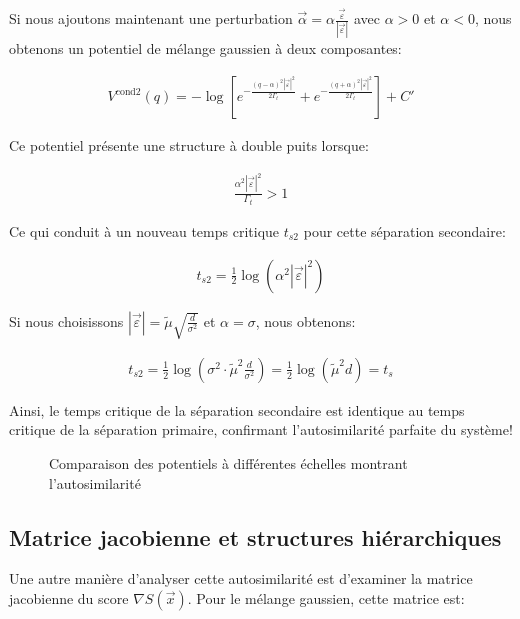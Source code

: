 \documentclass[11pt,a4paper]{article}
\begin{document}
Si nous ajoutons maintenant une perturbation $\vec{\alpha} = \alpha \frac{\vec{\varepsilon}}{|\vec{\varepsilon}|}$ avec $\alpha > 0$ et $\alpha < 0$, nous obtenons un potentiel de mélange gaussien à deux composantes:

\begin{align}
V^{\text{cond}2}(q) = -\log\left[e^{-\frac{(q-\alpha)^2|\vec{\varepsilon}|^2}{2\Gamma_t}} + e^{-\frac{(q+\alpha)^2|\vec{\varepsilon}|^2}{2\Gamma_t}}\right] + C'
\end{align}

Ce potentiel présente une structure à double puits lorsque:

\begin{align}
\frac{\alpha^2|\vec{\varepsilon}|^2}{\Gamma_t} > 1
\end{align}

Ce qui conduit à un nouveau temps critique $t_{s2}$ pour cette séparation secondaire:

\begin{align}
t_{s2} = \frac{1}{2}\log\left(\alpha^2|\vec{\varepsilon}|^2\right)
\end{align}

Si nous choisissons $|\vec{\varepsilon}| = \tilde{\mu}\sqrt{\frac{d}{\sigma^2}}$ et $\alpha = \sigma$, nous obtenons:

\begin{align}
t_{s2} = \frac{1}{2}\log\left(\sigma^2 \cdot \tilde{\mu}^2\frac{d}{\sigma^2}\right) = \frac{1}{2}\log\left(\tilde{\mu}^2 d\right) = t_s
\end{align}

Ainsi, le temps critique de la séparation secondaire est identique au temps critique de la séparation primaire, confirmant l'autosimilarité parfaite du système!

\begin{figure}[h]
    \centering
    \caption{Comparaison des potentiels à différentes échelles montrant l'autosimilarité}
    \label{fig:self_similarity}
\end{figure}

\subsection{Matrice jacobienne et structures hiérarchiques}

Une autre manière d'analyser cette autosimilarité est d'examiner la matrice jacobienne du score $\nabla S(\vec{x})$. Pour le mélange gaussien, cette matrice est:
\end{document}
